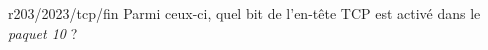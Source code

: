 \begin{question}{r203/2023/tcp/fin}
  Parmi ceux-ci, quel bit de l'en-tête TCP est activé dans le {\em paquet
  10} ?
  \begin{reponses}
  \end{reponses}
\end{question}
